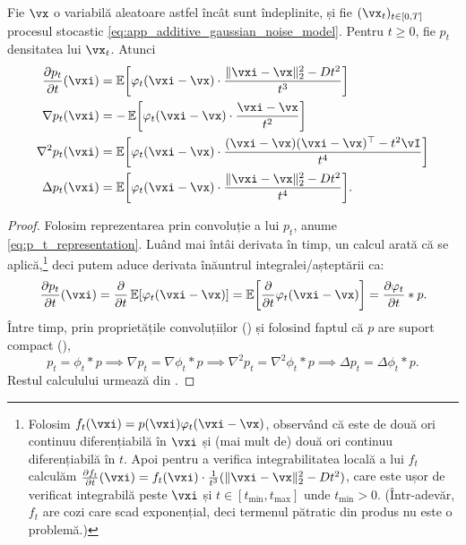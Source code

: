 \documentclass[../../book-main_ro.tex]{subfiles}
\begin{document}
\begin{proposition}\label{prop:p_t_derivatives}
    Fie \(\vx\) o variabilă aleatoare astfel încât  sunt îndeplinite, și fie \((\vx_{t})_{t \in [0, T]}\) procesul stocastic \eqref{eq:app_additive_gaussian_noise_model}. Pentru \(t \geq 0\), fie \(p_{t}\) densitatea lui \(\vx_{t}\). Atunci
    \begin{align}
        \pdv{p_{t}}{t}(\vxi)
        &= \Ex\rs{\phi_{t}(\vxi - \vx)\cdot\frac{\norm{\vxi - \vx}_{2}^{2} - Dt^{2}}{t^{3}}} \\
        \nabla p_{t}(\vxi)
        &= -\Ex\rs{\phi_{t}(\vxi - \vx)\cdot\frac{\vxi - \vx}{t^{2}}} \\
        \nabla^{2}p_{t}(\vxi)
        &= \Ex\rs{\phi_{t}(\vxi - \vx)\cdot\frac{(\vxi - \vx)(\vxi - \vx)^{\top} - t^{2}\vI}{t^{4}}} \\ 
        \Delta p_{t}(\vxi)
        &= \Ex\rs{\phi_{t}(\vxi - \vx)\cdot\frac{\norm{\vxi - \vx}_{2}^{2} - Dt^{2}}{t^{4}}}.
    \end{align}
\end{proposition}
\begin{proof} 
    Folosim reprezentarea prin convoluție a lui \(p_{t}\), anume \eqref{eq:p_t_representation}. Luând mai întâi derivata în timp, un calcul arată că  se aplică,\footnote{Folosim \(f_{t}(\vxi) = p(\vxi) \phi_{t}(\vxi - \vx)\), observând că este de două ori continuu diferențiabilă în \(\vxi\) și (mai mult de) două ori continuu diferențiabilă în \(t\). Apoi pentru a verifica integrabilitatea locală a lui \(f_{t}\) calculăm \(\pdv{f_{t}}{t}(\vxi) = f_{t}(\vxi)\cdot \frac{1}{t^{3}}(\norm{\vxi - \vx}_{2}^{2} - Dt^{2})\), care este ușor de verificat integrabilă peste \(\vxi\) și \(t \in [t_{\min}, t_{\max}]\) unde \(t_{\min} > 0\). (Într-adevăr, \(f_{t}\) are cozi care scad exponențial, deci termenul pătratic din produs nu este o problemă.)} deci putem aduce derivata înăuntrul integralei/așteptării ca:
    \begin{equation}
        \pdv{p_{t}}{t}(\vxi) = \pdv*{\Ex[\phi_{t}(\vxi - \vx)]}{t} = \Ex\rs{\pdv*{\phi_{t}(\vxi - \vx)}{t}} = \pdv{\phi_{t}}{t} * p.
    \end{equation}
    Între timp, prin proprietățile convoluțiilor () și folosind faptul că \(p\) are suport compact (),
    \begin{equation}
        p_{t} = \phi_{t} * p \implies \nabla p_{t} = \nabla \phi_{t} * p \implies \nabla^{2}p_{t} = \nabla^{2}\phi_{t} * p \implies \Delta p_{t} = \Delta \phi_{t} * p.
    \end{equation}
    Restul calculului urmează din .
\end{proof}
\end{document}
